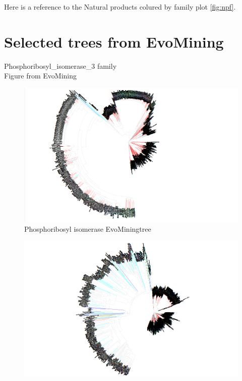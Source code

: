 \documentclass[12pt,twoside]{reedthesis}
\begin{document}
  Here is a reference to the Natural products colured by family plot
  \autoref{fig:npf}. \clearpage 
  
  \section{Selected trees from
  EvoMining}\label{selected-trees-from-evomining-2}
  
  Phosphoribosyl\_isomerase\_3 family\\
  Figure from EvoMining
  
  \begin{figure}[h!tbp]
  \centering
  \includegraphics[angle = 180,scale = 0.25]{chapter2/Cyanobacteria/tree64.png}
  \caption[Phosphoribosyl isomerase EvoMiningtree]{\normalsize{Phosphoribosyl isomerase EvoMiningtree}}
  \label{fig:Phosphoribosyl_isomerase_evo_tree}
  \end{figure}\begin{figure}[h!tbp]
  \centering
  \includegraphics[angle = 180,scale = 0.25]{chapter2/Cyanobacteria/tree1.png}

\end{figure}
\end{document}
